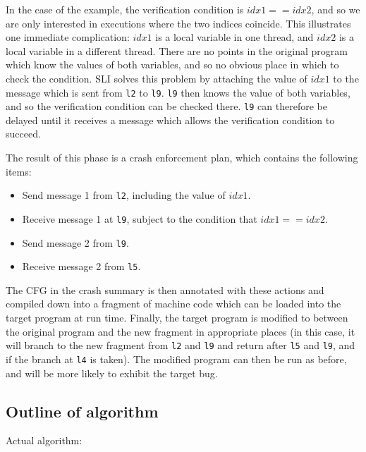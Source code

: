\documentclass[12pt,a4paper]{book}
\begin{document}
In the case of the example, the verification condition is $idx1 == idx2$, and so we are only interested in executions where the two indices coincide.
This illustrates one immediate complication: $idx1$ is a local variable in one thread, and $idx2$ is a local variable in a different thread.
There are no points in the original program which know the values of both variables, and so no obvious place in which to check the condition.
SLI solves this problem by attaching the value of $idx1$ to the message which is sent from \verb|l2| to \verb|l9|.
\verb|l9| then knows the value of both variables, and so the verification condition can be checked there.
\verb|l9| can therefore be delayed until it receives a message which allows the verification condition to succeed.

The result of this phase is a crash enforcement plan, which contains the following items:

\begin{itemize}
\item Send message 1 from \verb|l2|, including the value of $idx1$.
\item Receive message 1 at \verb|l9|, subject to the condition that $idx1 == idx2$.
\item Send message 2 from \verb|l9|.
\item Receive message 2 from \verb|l5|.
\end{itemize}

The CFG in the crash summary is then annotated with these actions and compiled down into a fragment of machine code which can be loaded into the target program at run time.
Finally, the target program is modified to between the original program and the new fragment in appropriate places (in this case, it will branch to the new fragment from \verb|l2| and \verb|l9| and return after \verb|l5| and \verb|l9|, and if the branch at \verb|l4| is taken).
The modified program can then be run as before, and will be more likely to exhibit the target bug.

\subsection{Outline of algorithm}

Actual algorithm:
\end{document}
